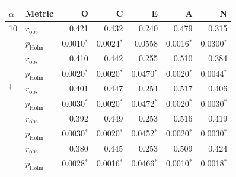 \begin{tabular}{llrrrrr}
\toprule
$\alpha$ & Metric & O & C & E & A & N \\
\midrule
10 & $r_{\mathrm{obs}}$ & 0.421 & 0.432 & 0.240 & 0.479 & 0.315 \\
 & $p_{\mathrm{Holm}}$ & 0.0010$^{*}$ & 0.0024$^{*}$ & 0.0558 & 0.0016$^{*}$ & 0.0300$^{*}$ \\
\addlinespace
50 & $r_{\mathrm{obs}}$ & 0.410 & 0.442 & 0.255 & 0.510 & 0.384 \\
 & $p_{\mathrm{Holm}}$ & 0.0020$^{*}$ & 0.0020$^{*}$ & 0.0470$^{*}$ & 0.0020$^{*}$ & 0.0044$^{*}$ \\
\addlinespace
100$^{\dagger}$ & $r_{\mathrm{obs}}$ & 0.401 & 0.447 & 0.254 & 0.517 & 0.406 \\
 & $p_{\mathrm{Holm}}$ & 0.0030$^{*}$ & 0.0020$^{*}$ & 0.0472$^{*}$ & 0.0020$^{*}$ & 0.0030$^{*}$ \\
\addlinespace
200 & $r_{\mathrm{obs}}$ & 0.392 & 0.449 & 0.253 & 0.516 & 0.419 \\
 & $p_{\mathrm{Holm}}$ & 0.0030$^{*}$ & 0.0020$^{*}$ & 0.0452$^{*}$ & 0.0020$^{*}$ & 0.0030$^{*}$ \\
\addlinespace
500 & $r_{\mathrm{obs}}$ & 0.380 & 0.445 & 0.253 & 0.509 & 0.424 \\
 & $p_{\mathrm{Holm}}$ & 0.0028$^{*}$ & 0.0016$^{*}$ & 0.0466$^{*}$ & 0.0010$^{*}$ & 0.0018$^{*}$ \\
\bottomrule
\end{tabular}

